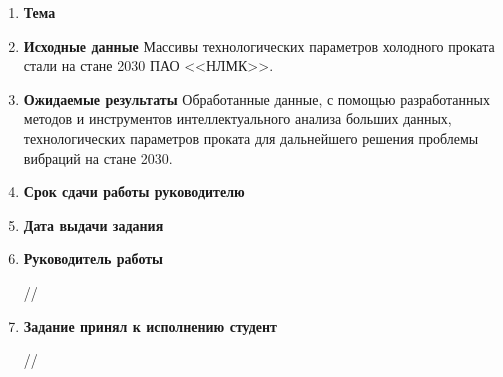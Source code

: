 \begin{enumerate}
	\item \textbf{Тема} \thema
	
	
	\item \textbf{Исходные данные} Массивы технологических параметров холодного
проката стали на стане 2030 ПАО <<НЛМК>>.
	
	\item \textbf{Ожидаемые результаты} Обработанные данные, с помощью разработанных методов и инструментов интеллектуального анализа больших данных, технологических параметров проката для дальнейшего решения проблемы вибраций на стане 2030.    
	
	\item \textbf{Срок сдачи работы руководителю} \hspace{1cm} \datasdachi

	
		
	\item \textbf{Дата выдачи задания} \hspace{1cm}  \datavydachi
	
	\item \textbf{Руководитель работы}
		\begin{flushright}
			\underline{\hspace{4cm}} /\adviser/
		\end{flushright}
		
	\item \textbf{Задание принял к исполнению студент}
		\begin{flushright}
			\underline{\hspace{4cm}} /\student/
		\end{flushright}	
\end{enumerate}			
	
	